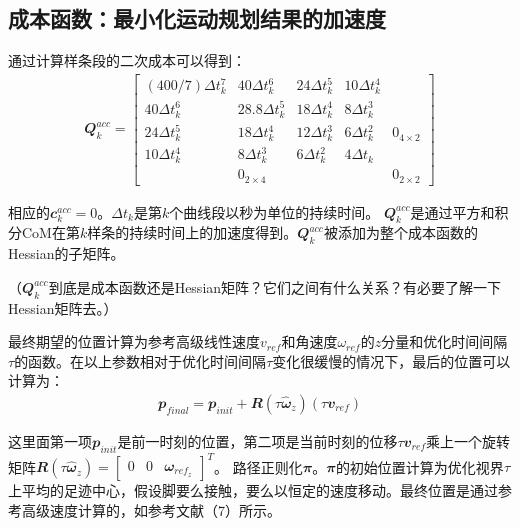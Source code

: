 \subsection{成本函数：最小化运动规划结果的加速度}
通过计算样条段的二次成本可以得到：
\begin{align}
    {\mathbfit Q}_k^{acc} = 
    \begin{bmatrix}
    (400/7)\Delta t_k^7 & 40\Delta t_k^6 & 24\Delta t_k^5 & 10\Delta t_k^4 & \\
    40\Delta t_k^6 & 28.8\Delta t_k^5 & 18\Delta t_k^4 & 8\Delta t_k^3 & \\
    24\Delta t_k^5 & 18\Delta t_k^4 & 12\Delta t_k^3 & 6\Delta t_k^2 & {\mathbfit 0}_{4\times 2}\\
    10\Delta t_k^4 & 8\Delta t_k^3 & 6\Delta t_k^2 & 4\Delta t_k &\\
     & {\mathbfit 0}_{2\times 4} & & & {\mathbfit 0}_{2\times 2}
    \end{bmatrix}
\end{align}


相应的${\mathbfit c}_k^{acc}=0$。$\Delta t_k$是第$k$个曲线段以秒为单位的持续时间。
${\mathbfit Q}_k^{acc}$是通过平方和积分CoM在第$k$样条的持续时间上的加速度得到。${\mathbfit Q}_k^{acc}$被添加为整个成本函数的Hessian的子矩阵。
\begin{note}
    （${\mathbfit Q}_k^{acc}$到底是成本函数还是Hessian矩阵？它们之间有什么关系？有必要了解一下Hessian矩阵去。）
\end{note}

最终期望的位置计算为参考高级线性速度$v_{ref}$和角速度$\omega_{ref}$的$z$分量和优化时间间隔$\tau$的函数。在以上参数相对于优化时间间隔$\tau$变化很缓慢的情况下，最后的位置可以计算为：
\begin{align}
    {\mathbfit p}_{final} = {\mathbfit p}_{init} + {\mathbfit R}(\tau \hat {\mathbfit \omega}_z)(\tau {\mathbfit v}_{ref})
\end{align}

这里面第一项${\mathbfit p}_{init}$是前一时刻的位置，第二项是当前时刻的位移$\tau {\mathbfit v}_{ref}$乘上一个旋转矩阵${\mathbfit R}(\tau \hat {\mathbfit \omega}_z)=\begin{bmatrix}0 & 0 & {\mathbfit \omega}_{ref_z}\end{bmatrix}^T$。
路径正则化${\mathbfit  \pi}$。$\mathbfit \pi$的初始位置计算为优化视界$\tau$上平均的足迹中心，假设脚要么接触，要么以恒定的速度移动。最终位置是通过参考高级速度计算的，如参考文献（7）所示。

